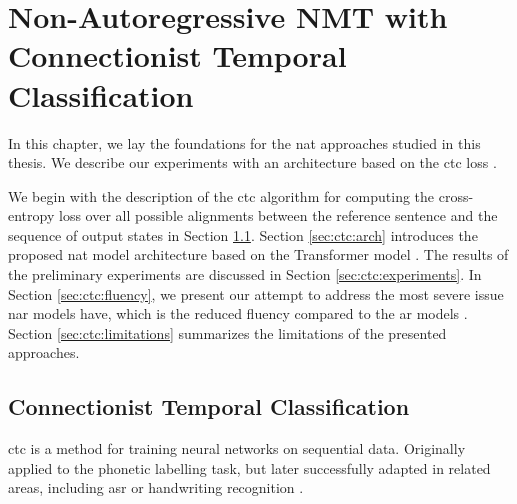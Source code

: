 \chapter{Non-Autoregressive NMT with Connectionist Temporal Classification}
\label{chap:nar-nmt-ctc}


\noindent
In this chapter, we lay the foundations for the \ac{nat} approaches studied in
this thesis. We describe our experiments with an architecture based on the
\ac{ctc} loss \citep{libovicky-helcl-2018-end}.


We begin with the description of the \ac{ctc} algorithm for computing the
cross-entropy loss over all possible alignments between the reference sentence
and the sequence of output states in Section \ref{sec:ctc}. Section
\ref{sec:ctc:arch} introduces the proposed \ac{nat} model architecture based on
the Transformer model \citep{vaswani2017attention}. The results of the
preliminary experiments are discussed in Section \ref{sec:ctc:experiments}. In
Section \ref{sec:ctc:fluency}, we present our attempt to address the most
severe issue \ac{nar} models have, which is the reduced fluency compared to the
\ac{ar} models \citep{kasner2020improving, kasner2020incorporating}. Section
\ref{sec:ctc:limitations} summarizes the limitations of the presented
approaches.

\section{Connectionist Temporal Classification}
\label{sec:ctc}

\Ac{ctc} \citep{graves2006connectionist} is a method for training neural
networks on sequential data. Originally applied to the phonetic labelling task,
but later successfully adapted in related areas, including \ac{asr} or
handwriting recognition \citep{liwicki2007novel, eyben2009speech,
  graves2014towards}.

